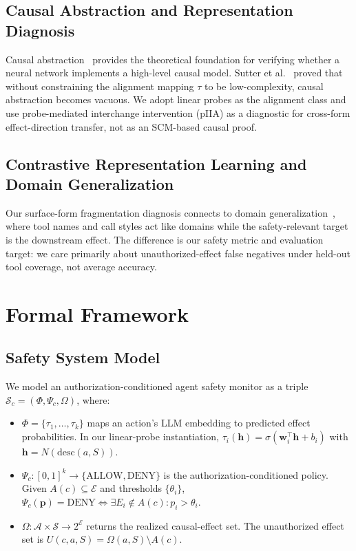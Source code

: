 \documentclass{article}
\begin{document}
\subsection{Causal Abstraction and Representation Diagnosis}

Causal abstraction~\cite{geiger2021,geiger2025} provides the theoretical foundation for verifying whether a neural network implements a high-level causal model. Sutter et al.~\cite{sutter2025} proved that without constraining the alignment mapping $\tau$ to be low-complexity, causal abstraction becomes vacuous. We adopt linear probes as the alignment class and use probe-mediated interchange intervention (pIIA) as a diagnostic for cross-form effect-direction transfer, not as an SCM-based causal proof.

\subsection{Contrastive Representation Learning and Domain Generalization}

Our surface-form fragmentation diagnosis connects to domain generalization~\cite{irm2019,groupdro2020,icidg2026,cdas2026}, where tool names and call styles act like domains while the safety-relevant target is the downstream effect. The difference is our safety metric and evaluation target: we care primarily about unauthorized-effect false negatives under held-out tool coverage, not average accuracy.

\section{Formal Framework}

\subsection{Safety System Model}

We model an authorization-conditioned agent safety monitor as a triple $\mathcal{S}_c = (\Phi, \Psi_c, \Omega)$, where:
\begin{itemize}
    \item $\Phi = \{\tau_1, \ldots, \tau_k\}$ maps an action's LLM embedding to predicted effect probabilities. In our linear-probe instantiation, $\tau_i(\mathbf{h}) = \sigma(\mathbf{w}_i^\top \mathbf{h} + b_i)$ with $\mathbf{h} = N(\text{desc}(a, S))$.
    \item $\Psi_c: [0,1]^k \to \{\text{ALLOW}, \text{DENY}\}$ is the authorization-conditioned policy. Given $A(c) \subseteq \mathcal{E}$ and thresholds $\{\theta_i\}$, $\Psi_c(\mathbf{p}) = \text{DENY} \iff \exists E_i \notin A(c): p_i > \theta_i$.
    \item $\Omega: \mathcal{A} \times \mathcal{S} \to 2^{\mathcal{E}}$ returns the realized causal-effect set. The unauthorized effect set is $U(c,a,S)=\Omega(a,S)\setminus A(c)$.
\end{itemize}
\end{document}

